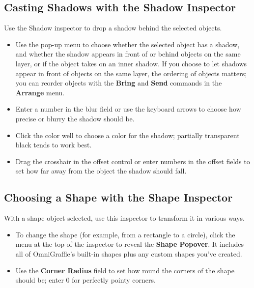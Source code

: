 \documentclass[../main.tex]{subfiles}
\begin{document}
\subsection{Casting Shadows with the Shadow Inspector}

Use the Shadow inspector to drop a shadow behind the selected objects.


\begin{itemize}
  \item Use the pop-up menu to choose whether the selected object has a shadow, and whether the
    shadow appears in front of or behind objects on the same layer, or if the object takes on an
    inner shadow. If you choose to let shadows appear in front of objects on the same layer, the
    ordering of objects matters; you can reorder objects with the \textbf{Bring} and
    \textbf{Send} commands in the \textbf{Arrange} menu.
  \item Enter a number in the blur field or use the keyboard arrows to choose how precise or
    blurry the shadow should be.
  \item Click the color well to choose a color for the shadow; partially transparent black tends
    to work best.
  \item Drag the crosshair in the offset control or enter numbers in the offset fields to set
    how far away from the object the shadow should fall.
\end{itemize}

\subsection{Choosing a Shape with the Shape Inspector}

With a shape object selected, use this inspector to transform it in various ways.


\begin{itemize}
  \item To change the shape (for example, from a rectangle to a circle), click the menu at the
    top of the inspector to reveal the \textbf{Shape Popover}. It includes all of OmniGraffle's
    built-in shapes plus any custom shapes you've created.

  \item Use the \textbf{Corner Radius} field to set how round the corners of the shape should
    be; enter 0 for perfectly pointy corners.
\end{itemize}
\end{document}
